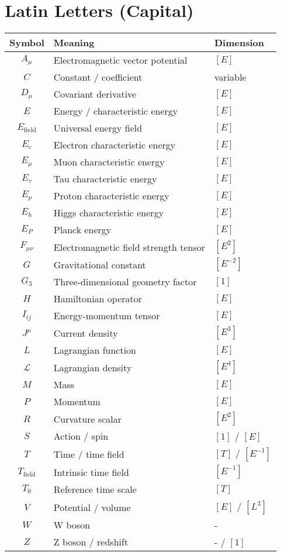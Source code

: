 \documentclass[12pt,a4paper]{report}
\begin{document}
\section{Latin Letters (Capital)}
\label{sec:latin_capitals}

\begin{longtable}{|c|l|l|}
	\hline
	\textbf{Symbol} & \textbf{Meaning} & \textbf{Dimension} \\
	\hline
	$A_\mu$ & Electromagnetic vector potential & $[E]$ \\
	$C$ & Constant / coefficient & variable \\
	$D_\mu$ & Covariant derivative & $[E]$ \\
	$E$ & Energy / characteristic energy & $[E]$ \\
	$E_{\text{field}}$ & Universal energy field & $[E]$ \\
	$E_e$ & Electron characteristic energy & $[E]$ \\
	$E_\mu$ & Muon characteristic energy & $[E]$ \\
	$E_\tau$ & Tau characteristic energy & $[E]$ \\
	$E_p$ & Proton characteristic energy & $[E]$ \\
	$E_h$ & Higgs characteristic energy & $[E]$ \\
	$E_P$ & Planck energy & $[E]$ \\
	$F_{\mu\nu}$ & Electromagnetic field strength tensor & $[E^2]$ \\
	$G$ & Gravitational constant & $[E^{-2}]$ \\
	$G_3$ & Three-dimensional geometry factor & $[1]$ \\
	$H$ & Hamiltonian operator & $[E]$ \\
	$I_{ij}$ & Energy-momentum tensor & $[E]$ \\
	$J^\mu$ & Current density & $[E^3]$ \\
	$L$ & Lagrangian function & $[E]$ \\
	$\mathcal{L}$ & Lagrangian density & $[E^4]$ \\
	$M$ & Mass & $[E]$ \\
	$P$ & Momentum & $[E]$ \\
	$R$ & Curvature scalar & $[E^2]$ \\
	$S$ & Action / spin & $[1]$ / $[E]$ \\
	$T$ & Time / time field & $[T]$ / $[E^{-1}]$ \\
	$T_{\text{field}}$ & Intrinsic time field & $[E^{-1}]$ \\
	$T_0$ & Reference time scale & $[T]$ \\
	$V$ & Potential / volume & $[E]$ / $[L^3]$ \\
	$W$ & W boson & - \\
	$Z$ & Z boson / redshift & - / $[1]$ \\
	\hline
\end{longtable}
\end{document}
